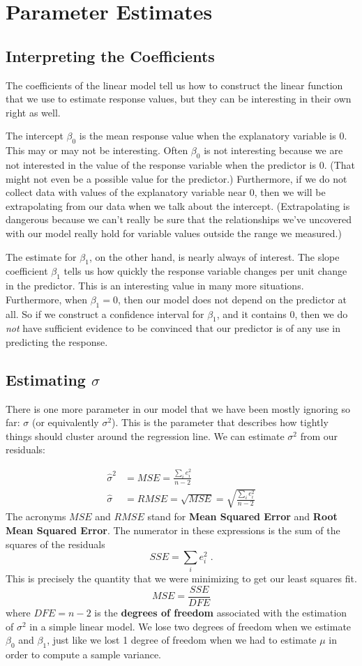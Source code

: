 \documentclass[twoside]{book}\usepackage[]{graphicx}\usepackage[]{xcolor}
\def\term#1{\textbf{#1}}
\begin{document}
\section{Parameter Estimates}
\subsection{Interpreting the Coefficients}
The coefficients of the linear model tell us how to construct the linear function
that we use to estimate response values, but they can be interesting in their own
right as well.

The intercept $\beta_0$ is the mean response value when the 
explanatory variable is 0.  This may or may not be interesting.
Often $\beta_0$ is not interesting because we are not interested
in the value of the response variable when the predictor is 0.  (That might not 
even be a possible value for the predictor.)  Furthermore, 
if we do not collect data with values of the explanatory variable near 0, then
we will be extrapolating from our data when we talk about the intercept. (Extrapolating is dangerous because we can't really be sure that the relationships we've uncovered with our model really hold for variable values outside the range we measured.)

The estimate for $\beta_1$, on the other hand, is nearly always of interest.
The slope coefficient $\beta_1$ tells us how quickly the response variable changes 
per unit change in the predictor.  This is an interesting value in many more situations.
Furthermore, when $\beta_1 = 0$, then our model does not depend on the predictor at all.
So if we construct a confidence interval for $\beta_1$, and it contains 0, then we do \emph{not} have sufficient evidence to be convinced that our predictor is of any use in predicting the response.

\subsection{Estimating $\sigma$}

There is one more parameter in our model that we have been mostly ignoring so far: $\sigma$ (or 
equivalently $\sigma^2$).  This is the parameter that describes how tightly things should 
cluster around the regression line.  We can estimate $\sigma^2$ from our residuals:

\begin{align*}
\hat\sigma^2 & = MSE = \frac{ \sum_i e_i^2 }{ n -2 }
\\
\hat\sigma & = RMSE = \sqrt{MSE} = \sqrt{\frac{ \sum_i e_i^2 }{ n -2 } }
\end{align*}
The acronyms $MSE$ and $RMSE$ stand for \term{Mean Squared Error} and 
\term{Root Mean Squared Error}.
The numerator in these expressions is the sum of the squares of the residuals
\[
SSE = \sum_i e_i^2 \;.
\]
This is precisely the quantity that we were minimizing to get our least squares fit.
\[
MSE = \frac{SSE}{DFE} 
\]
where $DFE = n-2$ is the \term{degrees of freedom} associated with the
estimation of $\sigma^2$ in a simple linear model.  We lose two degrees of
freedom when we estimate $\beta_0$ and $\beta_1$, just like we lost 1 degree of
freedom when we had to estimate $\mu$ in order to compute a sample variance.
\end{document}
